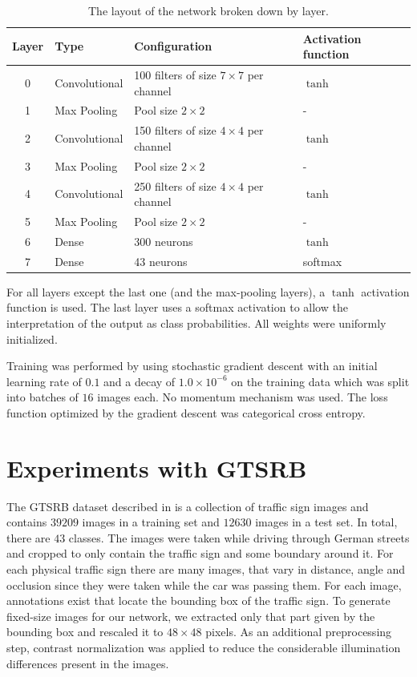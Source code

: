 \documentclass[11pt, a4paper]{article}
\begin{document}
\begin{table}[h!!!]
	\begin{tabular}{clll}
		Layer & Type & Configuration & Activation function \\
		\hline
		0 & Convolutional & 100 filters of size $7\times7$ per channel & $\tanh$ \\
		1 & Max Pooling & Pool size $2\times2$ & - \\
		2 & Convolutional & 150 filters of size $4\times4$ per channel & $\tanh$ \\
		3 & Max Pooling & Pool size $2\times2$ & - \\
		4 & Convolutional & 250 filters of size $4\times4$ per channel & $\tanh$ \\
		5 & Max Pooling & Pool size $2\times2$ & - \\
		6 & Dense & 300 neurons & $\tanh$ \\
		7 & Dense & 43 neurons & softmax
	\end{tabular}
	\caption{The layout of the network broken down by layer.}
	\label{tab:network-layout}
\end{table}

For all layers except the last one (and the max-pooling layers), a $\tanh$ activation function is used. The last layer uses a softmax activation to allow the interpretation of the output as class probabilities. All weights were uniformly initialized.

Training was performed by using stochastic gradient descent with an initial learning rate of $0.1$ and a decay of $1.0\times10^{-6}$ on the training data which was split into batches of $16$ images each. No momentum mechanism was used. The loss function optimized by the gradient descent was categorical cross entropy.

\section{Experiments with GTSRB}
The GTSRB dataset described in \cite{gtsrb} is a collection of traffic sign images and contains $39209$ images in a training set and $12630$ images in a test set. In total, there are $43$ classes. The images were taken while driving through German streets and cropped to only contain the traffic sign and some boundary around it. For each physical traffic sign there are many images, that vary in distance, angle and occlusion since they were taken while the car was passing them. For each image, annotations exist that locate the bounding box of the traffic sign. To generate fixed-size images for our network, we extracted only that part given by the bounding box and rescaled it to $48\times48$ pixels. As an additional preprocessing step, contrast normalization was applied to reduce the considerable illumination differences present in the images.
\end{document}
